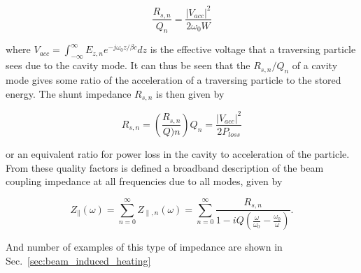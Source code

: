 \begin{equation}
\frac{R_{s, n}}{Q_{n}} = \frac{\left| V_{acc} \right|^{2}}{2 \omega_{0} W}
\end{equation}

where $V_{acc} = \int^{\infty}_{-\infty} E_{z, n} e^{-j \omega_{0} z/ \beta{}c} dz$ is the effective voltage that a traversing particle sees due to the cavity mode. It can thus be seen that the $R_{s, n}/Q_{n}$ of a cavity mode gives some ratio of the acceleration of a traversing particle to the stored energy. The shunt impedance $R_{s, n}$ is then given by

\begin{equation}
R_{s, n} = \left(  \frac{R_{s, n}}{Q){n}} \right) Q_{n} = \frac{\left| V_{acc} \right|^{2}}{2 P_{loss}}
\end{equation}

or an equivalent ratio for power loss in the cavity to acceleration of the particle. From these quality factors is defined a broadband description of the beam coupling impedance at all frequencies due to all modes, given by

\begin{equation}
Z_{\parallel} \left( \omega \right) = \displaystyle\sum\limits_{n = 0}^{\infty} Z_{\parallel, n} \left( \omega \right) = \displaystyle\sum\limits_{n = 0}^{\infty} \frac{R_{s, n}}{1 - iQ \left( \frac{\omega}{\omega_{0}} - \frac{\omega_{0}}{\omega} \right)}.
\end{equation}

And number of examples of this type of impedance are shown in Sec.~\ref{sec:beam_induced_heating}